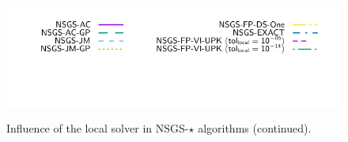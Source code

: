 \begin{figure}
     \\
    {\includegraphics[height=\legendheight]{figure/NSGS/LocalSolver/1.0e-08/50/time/profile-Chain_legend.pdf}}
    \caption{Influence of the local solver in {\sf NSGS-$\star$} algorithms (continued).}
    \label{fig:NSGS/LocalSolver}
  \end{figure}

